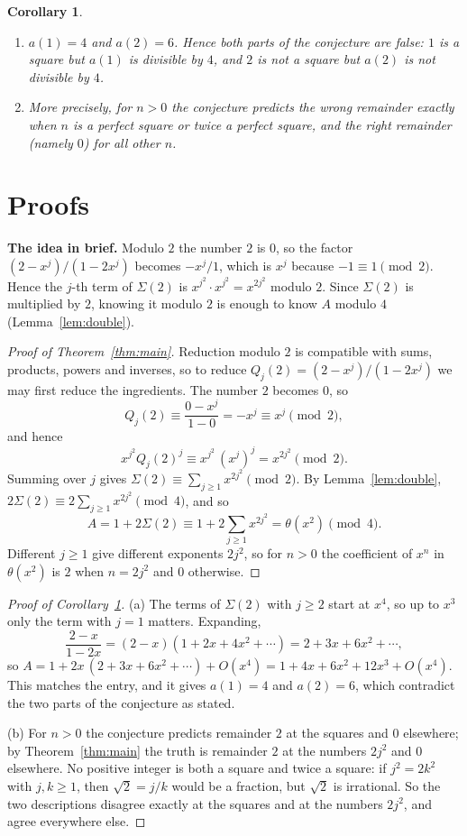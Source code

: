 \documentclass[11pt,a4paper]{article}
\newtheorem{corollary}[theorem]{Corollary}
\theoremstyle{definition}
\theoremstyle{remark}
\newcommand{\para}[1]{\par\medskip\noindent\textbf{#1}\enspace}
\begin{document}
\begin{corollary}\label{cor:false}
\begin{enumerate}[label=(\alph*)]
\item $a(1)=4$ and $a(2)=6$. Hence both parts of the conjecture are false: $1$ is a square but $a(1)$ is divisible by
$4$, and $2$ is not a square but $a(2)$ is not divisible by $4$.
\item More precisely, for $n>0$ the conjecture predicts the wrong remainder exactly when $n$ is a perfect square or
twice a perfect square, and the right remainder (namely $0$) for all other $n$.
\end{enumerate}
\end{corollary}

\section{Proofs}\label{sec:proofs}

\para{The idea in brief.} Modulo $2$ the number $2$ is $0$, so the factor $(2-x^j)/(1-2x^j)$ becomes $-x^j/1$, which is $x^j$ because
$-1\equiv1\pmod 2$. Hence the $j$-th term of $\Sigma(2)$ is $x^{j^2}\cdot x^{j^2}=x^{2j^2}$ modulo $2$. Since $\Sigma(2)$
is multiplied by $2$, knowing it modulo $2$ is enough to know $A$ modulo $4$ (Lemma~\ref{lem:double}).

\begin{proof}[Proof of Theorem~\ref{thm:main}]
Reduction modulo $2$ is compatible with sums, products, powers and inverses, so to reduce
$Q_j(2)=(2-x^j)/(1-2x^j)$ we may first reduce the ingredients. The number $2$ becomes $0$, so
\[
Q_j(2)\equiv\frac{0-x^j}{1-0}=-x^j\equiv x^j\pmod 2,
\]
and hence
\[
x^{j^2}Q_j(2)^j\equiv x^{j^2}\,(x^j)^j=x^{2j^2}\pmod 2 .
\]
Summing over $j$ gives $\Sigma(2)\equiv\sum_{j\ge1}x^{2j^2}\pmod2$. By Lemma~\ref{lem:double},
$2\Sigma(2)\equiv2\sum_{j\ge1}x^{2j^2}\pmod4$, and so
\[
A=1+2\Sigma(2)\equiv1+2\sum_{j\ge1}x^{2j^2}=\theta(x^2)\pmod 4 .
\]
Different $j\ge1$ give different exponents $2j^2$, so for $n>0$ the coefficient of $x^n$ in $\theta(x^2)$ is $2$ when
$n=2j^2$ and $0$ otherwise.
\end{proof}

\begin{proof}[Proof of Corollary~\ref{cor:false}]
(a) The terms of $\Sigma(2)$ with $j\ge2$ start at $x^4$, so up to $x^3$ only the term with $j=1$ matters. Expanding,
\[
\frac{2-x}{1-2x}=(2-x)(1+2x+4x^2+\cdots)=2+3x+6x^2+\cdots,
\]
so $A=1+2x\,(2+3x+6x^2+\cdots)+O(x^4)=1+4x+6x^2+12x^3+O(x^4)$. This matches the entry, and it gives $a(1)=4$ and
$a(2)=6$, which contradict the two parts of the conjecture as stated.

(b) For $n>0$ the conjecture predicts remainder $2$ at the squares and $0$ elsewhere; by Theorem~\ref{thm:main} the
truth is remainder $2$ at the numbers $2j^2$ and $0$ elsewhere. No positive integer is both a square and twice a
square: if $j^2=2k^2$ with $j,k\ge1$, then $\sqrt2=j/k$ would be a fraction, but $\sqrt2$ is irrational. So the two
descriptions disagree exactly at the squares and at the numbers $2j^2$, and agree everywhere else.
\end{proof}
\end{document}
